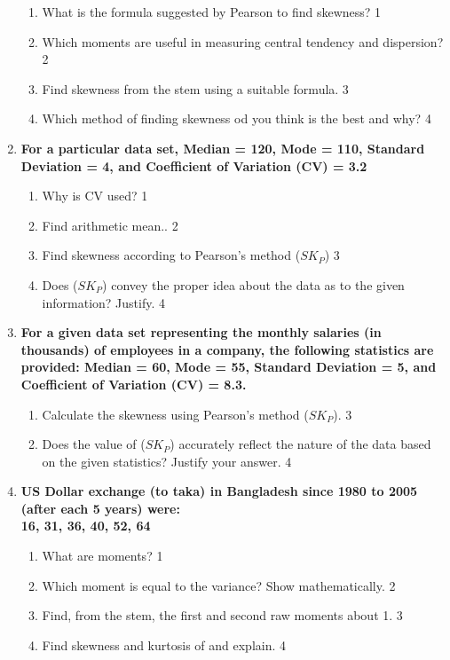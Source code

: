 \documentclass[a4paper,oneside]{book}
\begin{document}
\begin{enumerate}
  \begin{enumerate}
    \item
	What is the formula suggested by Pearson to find skewness? \hfill 1
    \item
	Which moments are useful in measuring central tendency and dispersion?  \hfill 2
    \item  
	Find skewness from the stem using a suitable formula. \hfill 3
    \item
	Which method of finding skewness od you think is the best and why? \hfill 4
\end{enumerate}

 \item
	  \textbf{For a particular data set, Median = 120, Mode = 110, Standard Deviation = 4, and Coefficient of Variation (CV)  = 3.2} 
  
  \begin{enumerate}
    \item
	Why is  CV used?  \hfill 1
    \item
	Find arithmetic mean.. \hfill 2
    \item  
	Find skewness according to Pearson's method ($SK_P$) \hfill 3
    \item
	Does ($SK_P$) convey the proper idea about the data as to the given information? Justify. \hfill 4
  \end{enumerate}
  
  \item
\textbf{For a given data set representing the monthly salaries (in thousands) of employees in a company, the following statistics are provided: Median = 60, Mode = 55, Standard Deviation = 5, and Coefficient of Variation (CV) = 8.3.}

\begin{enumerate}
    \item  
    Calculate the skewness using Pearson's method ($SK_P$). \hfill 3
    \item
    Does the value of ($SK_P$) accurately reflect the nature of the data based on the given statistics? Justify your answer. \hfill 4
\end{enumerate}


 \item
	  \textbf{US Dollar exchange (to taka) in Bangladesh since 1980 to 2005 (after each 5 years) were: \\ 16, 31, 36, 40, 52, 64} 
  
  \begin{enumerate}
    \item
	What are moments? \hfill 1
    \item
	Which moment is equal to the variance? Show mathematically. \hfill 2
    \item  
	Find, from the stem, the first and second raw moments about 1. \hfill 3
    \item
	Find skewness and kurtosis of and explain. \hfill 4
\end{enumerate}


\end{enumerate}
\end{document}
